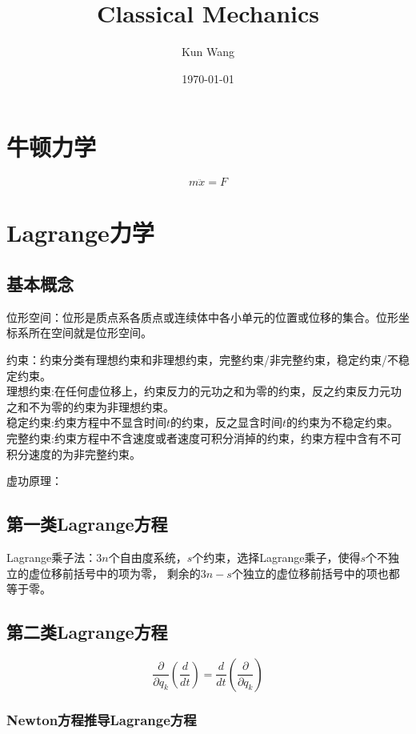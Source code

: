 \documentclass[12pt]{article}
\title{Classical Mechanics}
\author{Kun Wang}
\date{\today}
\numberwithin{equation}{section}
\begin{document}
        \maketitle
        \section{牛顿力学}
        \begin{equation}
            m\ddot{x}=F
        \end{equation}

        \section{Lagrange力学}
        \subsection{基本概念\cite{2006shen}}
        位形空间：位形是质点系各质点或连续体中各小单元的位置或位移的集合。位形坐标系所在空间就是位形空间。\par
        约束：约束分类有理想约束和非理想约束，完整约束/非完整约束，稳定约束/不稳定约束。\\
        理想约束:在任何虚位移上，约束反力的元功之和为零的约束，反之约束反力元功之和不为零的约束为非理想约束。\\
        稳定约束:约束方程中不显含时间$t$的约束，反之显含时间$t$的约束为不稳定约束。\\
        完整约束:约束方程中不含速度或者速度可积分消掉的约束，约束方程中含有不可积分速度的为非完整约束。
        \par
        虚功原理：
        \subsection{第一类Lagrange方程}
	Lagrange乘子法：$3n$个自由度系统，$s$个约束，选择Lagrange乘子，使得$s$个不独立的虚位移前括号中的项为零，
	剩余的$3n-s$个独立的虚位移前括号中的项也都等于零。
        \subsection{第二类Lagrange方程}
        \begin{equation}
            \frac{\partial}{\partial q_k}\left(\frac{d}{dt}\right)=\frac{d}{dt}\left(\frac{\partial}{\partial q_k}\right)
        \end{equation}

	\subsubsection{Newton方程推导Lagrange方程}
\end{document}

